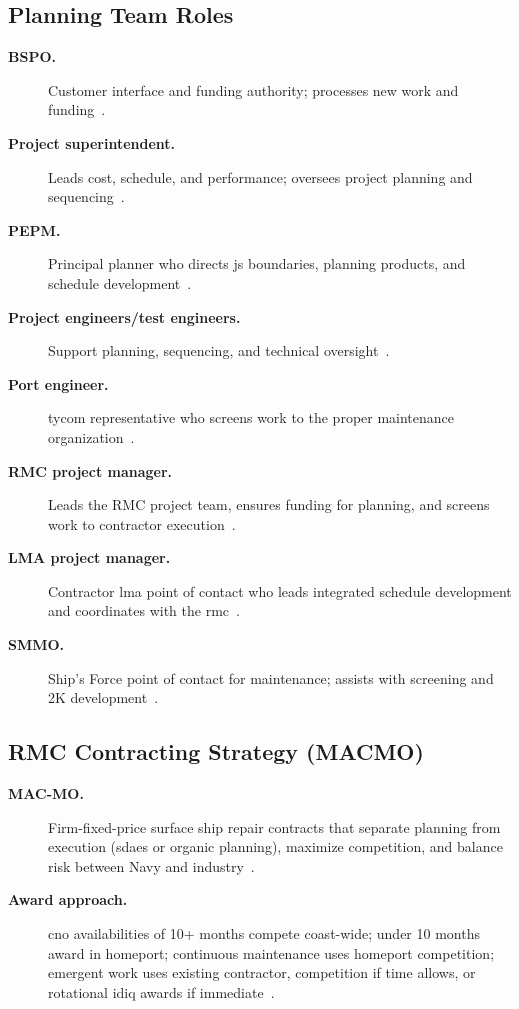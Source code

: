 \documentclass[../main.tex]{subfiles}
\begin{document}
\subsection{Planning Team Roles}
\begin{description}
  \item[\textbf{BSPO.}] Customer interface and funding authority; processes new work and funding~\autocite{edo-4-2-1-cno-availability-planning-2025}.
  \item[\textbf{Project superintendent.}] Leads cost, schedule, and performance; oversees project planning and sequencing~\autocite{edo-4-2-1-cno-availability-planning-2025}.
  \item[\textbf{PEPM.}] Principal planner who directs \ac{js} boundaries, planning products, and schedule development~\autocite{edo-4-2-1-cno-availability-planning-2025}.
  \item[\textbf{Project engineers/test engineers.}] Support planning, sequencing, and technical oversight~\autocite{edo-4-2-1-cno-availability-planning-2025}.
  \item[\textbf{Port engineer.}] \ac{tycom} representative who screens work to the proper maintenance organization~\autocite{edo-4-2-1-cno-availability-planning-2025}.
  \item[\textbf{RMC project manager.}] Leads the RMC project team, ensures funding for planning, and screens work to contractor execution~\autocite{edo-4-2-1-cno-availability-planning-2025}.
  \item[\textbf{LMA project manager.}] Contractor \ac{lma} point of contact who leads integrated schedule development and coordinates with the \ac{rmc}~\autocite{edo-4-2-1-cno-availability-planning-2025}.
  \item[\textbf{SMMO.}] Ship's Force point of contact for maintenance; assists with screening and 2K development~\autocite{edo-4-2-1-cno-availability-planning-2025}.
\end{description}

\subsection{RMC Contracting Strategy (MACMO)}
\begin{description}
  \item[\textbf{MAC-MO.}] Firm-fixed-price surface ship repair contracts that separate planning from execution (\ac{sdaes} or organic planning), maximize competition, and balance risk between Navy and industry~\autocite{edo-4-2-1-cno-availability-planning-2025}.
  \item[\textbf{Award approach.}] \ac{cno} availabilities of 10+ months compete coast-wide; under 10 months award in homeport; continuous maintenance uses homeport competition; emergent work uses existing contractor, competition if time allows, or rotational \ac{idiq} awards if immediate~\autocite{edo-4-2-1-cno-availability-planning-2025}.
\end{description}
\end{document}
